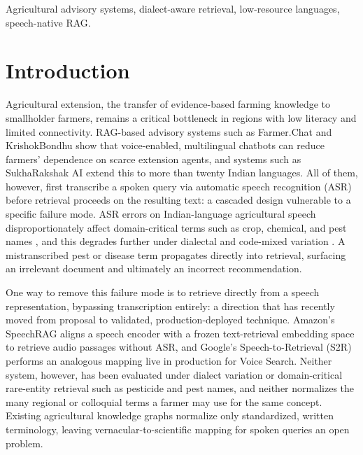 \documentclass[conference]{IEEEtran}
\begin{document}
\renewcommand\IEEEkeywordsname{Keywords}
\begin{IEEEkeywords}
Agricultural advisory systems, dialect-aware retrieval, low-resource languages, speech-native RAG.
\end{IEEEkeywords}

\section{Introduction}
Agricultural extension, the transfer of evidence-based farming knowledge to smallholder farmers, remains a critical bottleneck in regions with low literacy and limited connectivity. RAG-based advisory systems such as Farmer.Chat \cite{farmerchat2024} and KrishokBondhu \cite{ameen2026krishokbondhu} show that voice-enabled, multilingual chatbots can reduce farmers' dependence on scarce extension agents, and systems such as SukhaRakshak AI \cite{iwmi2025sukharakshak} extend this to more than twenty Indian languages. All of them, however, first transcribe a spoken query via automatic speech recognition (ASR) before retrieval proceeds on the resulting text: a cascaded design vulnerable to a specific failure mode. ASR errors on Indian-language agricultural speech disproportionately affect domain-critical terms such as crop, chemical, and pest names \cite{benchmarkingasr2026}, and this degrades further under dialectal and code-mixed variation \cite{dialectmatters2026}. A mistranscribed pest or disease term propagates directly into retrieval, surfacing an irrelevant document and ultimately an incorrect recommendation.

One way to remove this failure mode is to retrieve directly from a speech representation, bypassing transcription entirely: a direction that has recently moved from proposal to validated, production-deployed technique. Amazon's SpeechRAG \cite{min2025speechrag} aligns a speech encoder with a frozen text-retrieval embedding space to retrieve audio passages without ASR, and Google's Speech-to-Retrieval (S2R) \cite{google2025s2r} performs an analogous mapping live in production for Voice Search. Neither system, however, has been evaluated under dialect variation or domain-critical rare-entity retrieval such as pesticide and pest names, and neither normalizes the many regional or colloquial terms a farmer may use for the same concept. Existing agricultural knowledge graphs \cite{wu2026cropgraphrag, kgeditorial2023} normalize only standardized, written terminology, leaving vernacular-to-scientific mapping for spoken queries an open problem.
\end{document}
